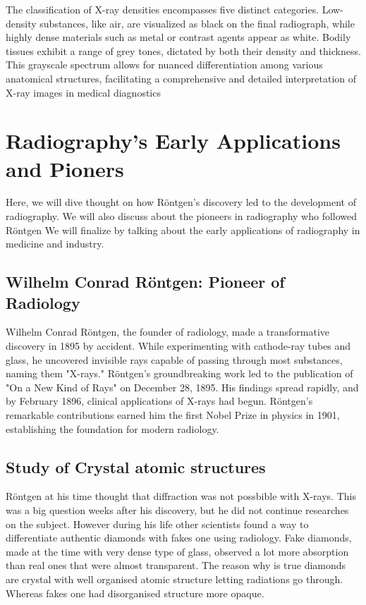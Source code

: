 \documentclass[a4paper,12pt]{report}
\begin{document}
The classification of X-ray densities encompasses five distinct categories. Low-density
substances, like air, are visualized as black on the final radiograph, while highly dense materials
such as metal or contrast agents appear as white. Bodily tissues exhibit a range of grey tones,
dictated by both their density and thickness. This grayscale spectrum allows for nuanced
differentiation among various anatomical structures, facilitating a comprehensive and detailed
interpretation of X-ray images in medical diagnostics


\section{Radiography's Early Applications and Pioners}
Here, we will dive thought on how Röntgen's discovery led to the development of radiography. We will also discuss about the pioneers in radiography who followed Röntgen We will finalize by talking about the early applications of radiography in medicine and industry.
\subsection{Wilhelm Conrad Röntgen: Pioneer of Radiology}
Wilhelm Conrad Röntgen, the founder of radiology, made a transformative discovery in 1895 by
accident. While experimenting with cathode-ray tubes and glass, he uncovered invisible rays
capable of passing through most substances, naming them "X-rays." Röntgen's groundbreaking
work led to the publication of "On a New Kind of Rays" on December 28, 1895. His findings spread
rapidly, and by February 1896, clinical applications of X-rays had begun. Röntgen's remarkable
contributions earned him the first Nobel Prize in physics in 1901, establishing the foundation for
modern radiology.
\subsection{Study of Crystal atomic structures}

Röntgen at his time thought that diffraction was not possbible with X-rays. This was a big question weeks after his discovery, but he did not continue researches on the subject. 
However during his life other scientists found a way to differentiate authentic diamonds with fakes one using radiology. Fake diamonds, made at the time with very dense type of glass, observed a lot more absorption than real ones that were almost transparent. The reason why is true diamonds are crystal with well organised atomic structure letting radiations go through. Whereas fakes one had disorganised structure more opaque.
\end{document}
